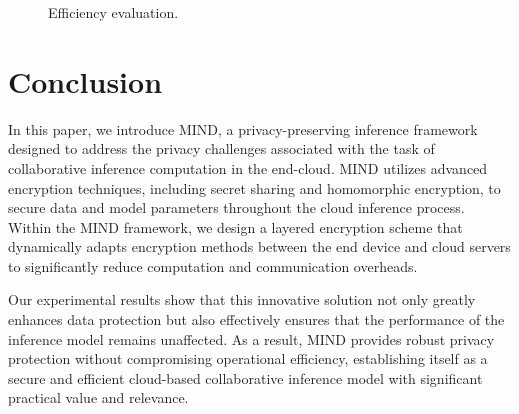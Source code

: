 ﻿\documentclass[conference]{IEEEtran}
\providecommand{\DIFaddtex}[1]{{\protect\color{blue}\uwave{#1}}} %
\providecommand{\DIFdelbegin}{} %
\providecommand{\DIFdelend}{} %
\providecommand{\DIFaddFL}[1]{\DIFadd{#1}} %
\providecommand{\DIFaddendFL}{} %
\providecommand{\DIFadd}[1]{\texorpdfstring{\DIFaddtex{#1}}{#1}} %
\newcommand{\DIFscaledelfig}{0.5}
\newlength{\DIFdelgraphicswidth} %
\newlength{\DIFdelgraphicsheight} %
\newcommand{\DIFdelincludegraphics}[2][]{%
\sbox{\DIFdelgraphicsbox}{\DIFOincludegraphics[#1]{#2}}%
\settoboxwidth{\DIFdelgraphicswidth}{\DIFdelgraphicsbox} %
\settoboxtotalheight{\DIFdelgraphicsheight}{\DIFdelgraphicsbox} %
\scalebox{\DIFscaledelfig}{%
\parbox[b]{\DIFdelgraphicswidth}{\usebox{\DIFdelgraphicsbox}\\[-\baselineskip] \rule{\DIFdelgraphicswidth}{0em}}\llap{\resizebox{\DIFdelgraphicswidth}{\DIFdelgraphicsheight}{%
\setlength{\unitlength}{\DIFdelgraphicswidth}%
\begin{picture}(1,1)%
\thicklines\linethickness{2pt} %
{\color[rgb]{1,0,0}\put(0,0){\framebox(1,1){}}}%
{\color[rgb]{1,0,0}\put(0,0){\line( 1,1){1}}}%
{\color[rgb]{1,0,0}\put(0,1){\line(1,-1){1}}}%
\end{picture}%
}\hspace*{3pt}}} %
} %
\DeclareRobustCommand{\DIFdelbegin}{\DIFOdelbegin \let\includegraphics\DIFdelincludegraphics} %
\DeclareRobustCommand{\DIFdelend}{\DIFOaddend \let\includegraphics\DIFOincludegraphics} %
\DeclareRobustCommand{\DIFaddendFL}{\DIFOaddendFL \let\includegraphics\DIFOincludegraphics} %
\begin{document}
\begin{figure}[ht]
     \DIFaddFL{\hspace{5pt}
    } \DIFaddFL{\hspace{5pt}
    }\DIFaddendFL \caption{Efficiency evaluation.}
    \label{fig:efficiency}
\end{figure}
\DIFdelbegin %

\DIFdelend %

\section{Conclusion}
In this paper, we introduce MIND, a privacy-preserving inference framework designed to address the privacy challenges associated with the task of collaborative inference computation in the end-cloud. MIND utilizes advanced encryption techniques, including secret sharing and homomorphic encryption, to secure data and model parameters throughout the cloud inference process. Within the MIND framework, we design a layered encryption scheme that dynamically adapts encryption methods between the end device and cloud servers to significantly reduce computation and communication overheads.

Our experimental results show that this innovative solution not only greatly enhances data protection but also effectively ensures that the performance of the inference model remains unaffected. As a result, MIND provides robust privacy protection without compromising operational efficiency, establishing itself as a secure and efficient cloud-based collaborative inference model with significant practical value and relevance.
\end{document}

